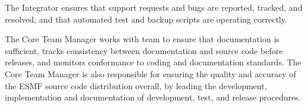 The Integrator ensures that support requests
and bugs are reported, tracked, and resolved, and that automated
test and backup scripts are operating correctly.

The Core Team Manager works with team to ensure that documentation
is sufficient, tracks consistency between documentation and source
code before releases, and monitors conformance to coding and
documentation standards.  The Core Team Manager is also responsible
for ensuring the quality and accuracy of the ESMF source code
distribution overall, by leading the development,
implementation and documentation of development, test, and release
procedures.










